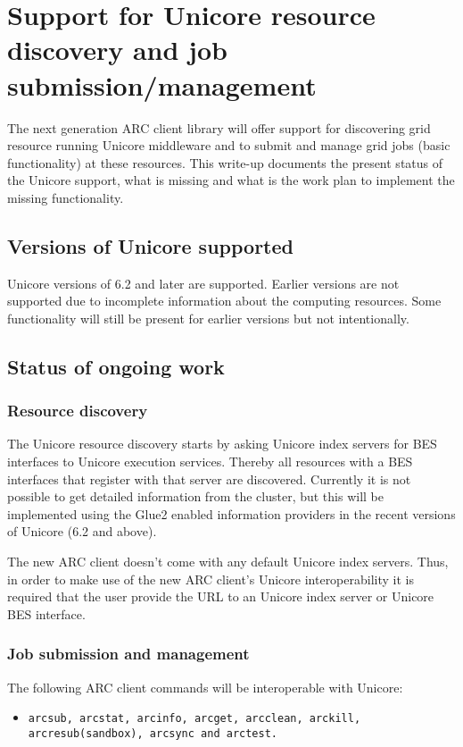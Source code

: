 \documentclass[11pt,oneside,a4paper,english]{article}
\begin{document}
\section*{Support for Unicore resource discovery and job submission/management}
The next generation ARC client library will offer support for discovering grid resource running Unicore middleware and to submit and manage grid jobs (basic functionality) at these resources. This write-up documents the present status of the Unicore support, what is missing and what is the work plan to implement the missing functionality.
\subsection*{Versions of Unicore supported}
Unicore versions of 6.2 and later are supported. Earlier versions are not supported due to incomplete information about the computing resources. Some functionality will still be present for earlier versions but not intentionally. 
\subsection*{Status of ongoing work}
\subsubsection*{Resource discovery}
The Unicore resource discovery starts by asking Unicore index servers for BES interfaces to Unicore execution services. Thereby all resources with a BES interfaces that register with that server are discovered. Currently it is not possible to get detailed information from the cluster, but this will be implemented using the Glue2 enabled information providers in the recent versions of Unicore (6.2 and above).

The new ARC client doesn't come with any default Unicore index servers. Thus, in order to make use of the new ARC client's Unicore interoperability it is required that the user provide the URL to an Unicore index server or Unicore BES interface. 
\subsubsection*{Job submission and management}
The following ARC client commands will be interoperable with Unicore: 
\begin{itemize}
\item{\texttt{arcsub, arcstat, arcinfo, arcget, arcclean, arckill, arcresub(sandbox), arcsync and arctest.}} 
\end{itemize}
\end{document}
